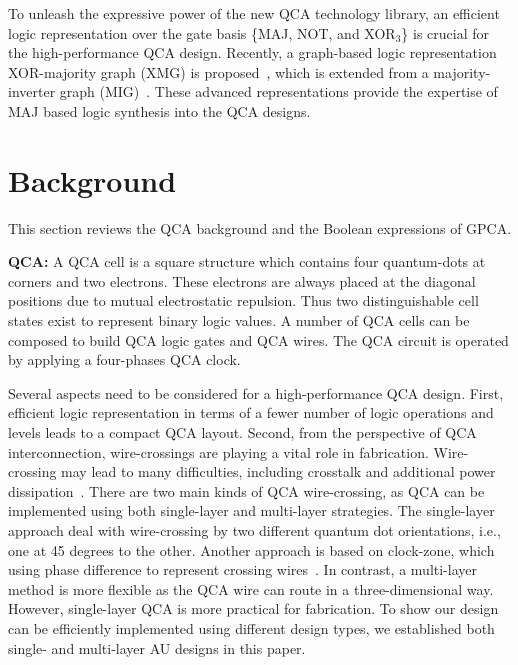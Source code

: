 \documentclass[9pt,journal,compsoc]{IEEEtran}
\begin{document}
To unleash the expressive power of the new QCA technology library, an efficient logic representation over the gate basis \{MAJ, NOT, and XOR$_3$\} is crucial for the high-performance QCA design. Recently, a graph-based logic representation XOR-majority graph (XMG) is proposed~\cite{haaswijk2017novel}, which is extended from a majority-inverter graph (MIG)~\cite{amaru2014majority}. 
These advanced representations provide the expertise of MAJ based logic synthesis into the QCA designs.

\vspace{-2ex}
\section{Background}
This section reviews the QCA background and the Boolean expressions of GPCA.

\textbf{QCA:}
A QCA cell is a square structure which contains four quantum-dots at corners and two electrons.
These electrons are always placed at the diagonal positions due to mutual electrostatic repulsion. Thus two distinguishable cell states exist to represent binary logic values. A number of QCA cells can be composed to build QCA logic gates and QCA wires.
The QCA circuit is operated by applying a four-phases QCA clock.

Several aspects need to be considered for a high-performance QCA design.
First, efficient logic representation in terms of a fewer number of logic operations and levels leads to a compact QCA layout.
Second, from the perspective of QCA interconnection, wire-crossings are playing a vital role in fabrication.
Wire-crossing may lead to many difficulties, including crosstalk and additional power dissipation~\cite{nath2017optimal}.
There are two main kinds of QCA wire-crossing, as QCA can be implemented using both single-layer and multi-layer strategies. 
The single-layer approach deal with wire-crossing by two different quantum dot orientations, i.e., one at 45 degrees to the other. Another approach is based on clock-zone, which using phase difference to represent crossing wires~\cite{shin2013wire}.
In contrast, a multi-layer method is more flexible as the QCA wire can route in a three-dimensional way.
However, single-layer QCA is more practical for fabrication.
To show our design can be efficiently implemented using different design types, we established both single- and multi-layer AU designs in this paper.
  
\end{document}
